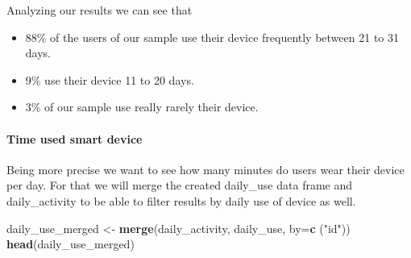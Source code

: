 \documentclass[
]{article}
\newenvironment{Shaded}{\begin{snugshade}}{\end{snugshade}}
\newcommand{\AttributeTok}[1]{\textcolor[rgb]{0.13,0.29,0.53}{#1}}
\newcommand{\FunctionTok}[1]{\textcolor[rgb]{0.13,0.29,0.53}{\textbf{#1}}}
\newcommand{\NormalTok}[1]{#1}
\newcommand{\OtherTok}[1]{\textcolor[rgb]{0.56,0.35,0.01}{#1}}
\newcommand{\StringTok}[1]{\textcolor[rgb]{0.31,0.60,0.02}{#1}}
\providecommand{\tightlist}{%
  \setlength{\itemsep}{0pt}\setlength{\parskip}{0pt}}
\begin{document}
Analyzing our results we can see that

\begin{itemize}
\tightlist
\item
  88\% of the users of our sample use their device frequently between 21
  to 31 days.
\item
  9\% use their device 11 to 20 days.
\item
  3\% of our sample use really rarely their device.
\end{itemize}

\hypertarget{time-used-smart-device}{%
\paragraph{Time used smart device}\label{time-used-smart-device}}

Being more precise we want to see how many minutes do users wear their
device per day. For that we will merge the created daily\_use data frame
and daily\_activity to be able to filter results by daily use of device
as well.

\begin{Shaded}
\begin{Highlighting}[]
\NormalTok{daily\_use\_merged }\OtherTok{\textless{}{-}} \FunctionTok{merge}\NormalTok{(daily\_activity, daily\_use, }\AttributeTok{by=}\FunctionTok{c}\NormalTok{ (}\StringTok{"id"}\NormalTok{))}
\FunctionTok{head}\NormalTok{(daily\_use\_merged)}
\end{Highlighting}
\end{Shaded}
\end{document}
